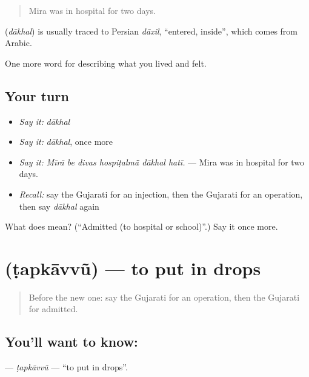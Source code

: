 \begin{quote}
Mira was in hospital for two days.
\end{quote}

\begin{cousinweb}
\textbf{} (\emph{dākhal}) is usually traced to Persian \emph{dāxil}, \textquotedblleft{}entered, inside\textquotedblright{}, which comes from Arabic.
\end{cousinweb}

\begin{grammarlens}[title={What you've built}]
One more word for describing what you lived and felt.
\end{grammarlens}

\subsection*{Your turn}
\begin{itemize}
\raggedright
  \item \emph{Say it:} \emph{dākhal}
  \item \emph{Say it:} \emph{dākhal}, once more
  \item \emph{Say it:} \emph{Mīrā be divas hospiṭalmā̃ dākhal hatī.} — Mira was in hospital for two days.
  \item \emph{Recall:} say the Gujarati for an injection, then the Gujarati for an operation, then say \emph{dākhal} again
\end{itemize}

\begin{tcolorbox}[breakable,colback=teal!4,colframe=teal!35!black,title={Before you move on}]
What does  mean? (\textquotedblleft{}Admitted (to hospital or school)\textquotedblright{}.) Say it once more.
\end{tcolorbox}
\section[\texorpdfstring{\gu{ટપકાવવું} (ṭapkāvvũ)}{ટપકાવવું (ṭapkāvvũ)}]{ (ṭapkāvvũ) — to put in drops}

\label{lesson:GU-C485-tapkavvu}



\begin{quote}
Before the new one: say the Gujarati for an operation, then the Gujarati for admitted.
\end{quote}

\subsection*{You'll want to know: }
\textbf{} — \emph{ṭapkāvvũ} — \textquotedblleft{}to put in drops\textquotedblright{}.


